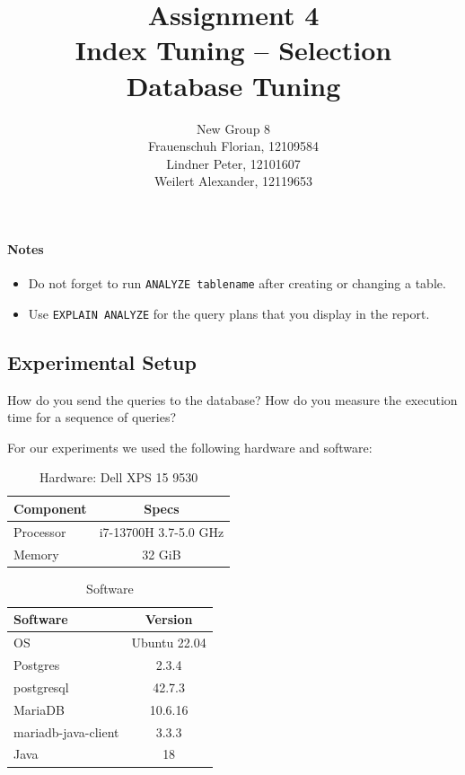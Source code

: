 \documentclass[11pt]{scrartcl}
\title{
  \textbf{\large Assignment 4} \\
  Index Tuning -- Selection \\
  {\large Database Tuning}}
\author{
  New Group 8 \\
  \large Frauenschuh Florian, 12109584 \\
  \large Lindner Peter, 12101607 \\
  \large Weilert Alexander, 12119653
}
\begin{document}
\maketitle

\paragraph{Notes}

\begin{itemize}
  \item Do not forget to run \lstinline[style=dbtsql]{ANALYZE tablename} after creating or changing a table.
  \item Use \lstinline[style=dbtsql]{EXPLAIN ANALYZE} for the query plans that you display in the report.
\end{itemize}

\subsection*{Experimental Setup}

How do you send the queries to the database? How do you measure the execution time for a sequence of queries?

For our experiments we used the following hardware and software:

\begin{multicols}{2}
  \begin{table}[H]
    \centering
    \begin{tabular}{lc}
      \toprule
      Component & Specs \\
      \midrule
      Processor & i7-13700H 3.7-5.0 GHz \\
      Memory & 32 GiB \\
      \bottomrule
    \end{tabular}
    \caption{Hardware: Dell XPS 15 9530}
    \label{table:hardware}
  \end{table}

  \columnbreak

  \begin{table}[H]
    \centering
    \begin{tabular}{lc}
      \toprule
      Software & Version \\
      \midrule
      OS & Ubuntu 22.04 \\
      Postgres & 2.3.4 \\
      postgresql & 42.7.3 \\
      MariaDB & 10.6.16 \\
      mariadb-java-client & 3.3.3 \\
      Java & 18 \\
      \bottomrule
    \end{tabular}
    \caption{Software}
    \label{table:software_versions}
  \end{table}
\end{multicols}
\end{document}
